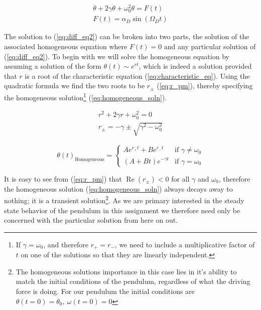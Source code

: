 \documentclass[notitlepage,aps,prd,nofootinbib]{revtex4-1}
\begin{document}
\begin{equation} \label{eq:diff_eq2} 
\begin{gathered}
\ddot{\theta} + 2\gamma \dot{\theta} + \omega_{0}^2 \theta = F\left(t\right) \\
F\left(t\right) = \alpha_{D} \sin\left(\Omega_{D} t\right)
\end{gathered}
\end{equation}

The solution to (\ref{eq:diff_eq2}) can be broken into two parts, the solution of the associated homogeneous equation where $F\left(t\right) = 0$ and any particular solution of (\ref{eq:diff_eq2}). To begin with we will solve the homogeneous equation by assuming a solution of the form $\theta\left(t\right) \sim e^{r t}$, which is indeed a solution provided that $r$ is a root of the characteristic equation (\ref{eq:characteristic_eq}). Using the quadratic formula we find the two roots to be $r_{\pm}$ (\ref{eq:r_pm}), thereby specifying the homogeneous solution\footnote{If $\gamma = \omega_{0}$, and therefore $r_{+} = r_{-}$, we need to include a multiplicative factor of $t$ on one of the solutions so that they are linearly independent.} (\ref{eq:homogeneous_soln}). 

\begin{gather}
r^2 + 2 \gamma r + \omega_{0}^2 = 0 \label{eq:characteristic_eq} \\
r_{\pm} = -\gamma \pm \sqrt{\gamma^2 - \omega_{0}^2} \label{eq:r_pm}
\end{gather}

\begin{equation} \label{eq:homogeneous_soln}
\theta\left(t\right)_{\text{Homogeneous}} =
\begin{cases}
A e^{r_{+} t} + B e^{r_{-} t} & \text{if } \gamma \neq \omega_{0} \\
\left(A + B t\right) e^{-\gamma t} & \text{if } \gamma = \omega_{0}
\end{cases}
\end{equation}

It is easy to see from (\ref{eq:r_pm}) that $\operatorname{Re}\left(r_{\pm}\right) < 0$ for all $\gamma$ and $\omega_{0}$, therefore the homogeneous solution (\ref{eq:homogeneous_soln}) always decays away to nothing; it is a transient solution\footnote{The homogeneous solutions importance in this case lies in it's ability to match the initial conditions of the pendulum, regardless of what the driving force is doing. For our pendulum the initial conditions are $\theta\left(t=0\right)=\theta_{0},~\omega\left(t=0\right)=0$}. As we are primary interested in the steady state behavior of the pendulum in this assignment we therefore need only be concerned with the particular solution from here on out.
\end{document}
